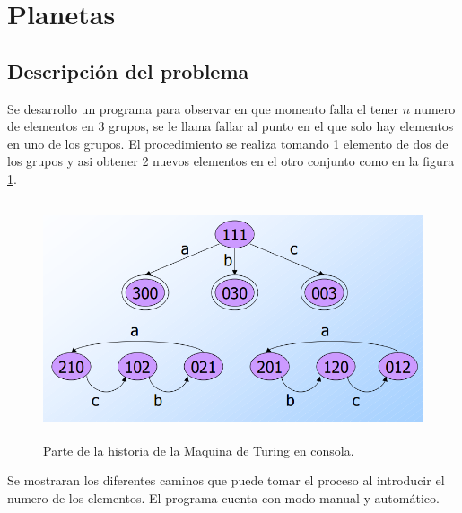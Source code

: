 \section{Planetas}
	\subsection{Descripción del problema}
	Se desarrollo un programa para observar en que momento falla el tener $n$ numero de elementos en 3 grupos, se le llama fallar al punto en el que solo hay elementos en uno de los grupos.
	El procedimiento se realiza tomando 1 elemento de dos de los grupos y asi obtener 2 nuevos elementos en el otro conjunto como en la figura \ref{fig:marcianos}.
	\begin{figure}[H]
		\begin{center}
			\includegraphics[width=\linewidth, height=7cm]{img/marcianos.png}
			\caption{Parte de la historia de la Maquina de Turing en consola.}
			\label{fig:marcianos}
		\end{center}
	\end{figure}
	Se mostraran los diferentes caminos que puede tomar el proceso al introducir el numero de los elementos. El programa cuenta con modo manual y automático.
